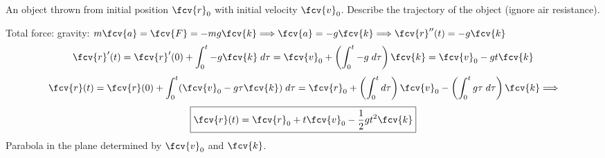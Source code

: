 \begin{frame}
\begin{example}
An object thrown from initial position $\fcv{r}_0$ with initial velocity $\fcv{v}_0$. Describe the trajectory of the object (ignore air resistance).\pause

Total force: gravity: $m\fcv{a} = \fcv{F} =  -mg \fcv{k} \Longrightarrow \fcv{a} = -g \fcv{k} \Longrightarrow \fcv{r}''(t) = -g \fcv{k}$
\pause
$$\fcv{r}'(t) = \fcv{r}'(0) + \int_{0}^t -g \fcv{k} \; d\tau = \fcv{v}_0 + \left(\int_{0}^t -g\; d\tau \right) \fcv{k} = \fcv{v}_0 -gt \fcv{k}$$
\pause
$$\fcv{r}(t) = \fcv{r}(0) + \int_{0}^t (\fcv{v}_0-g\tau \fcv{k}) \; d\tau = \fcv{r}_0 + \left( \int_0^t d\tau \right) \fcv{v}_0 - \left( \int_0^t g\tau \; d\tau \right) \fcv{k} \Longrightarrow$$
%
$$\boxed{\fcv{r}(t) = \fcv{r}_0  +t  \fcv{v}_0 - \frac{1}{2}gt^2 \fcv{k}}$$
\pause
Parabola in the plane determined by $\fcv{v}_0$ and $\fcv{k}$.
\end{example}
\end{frame}